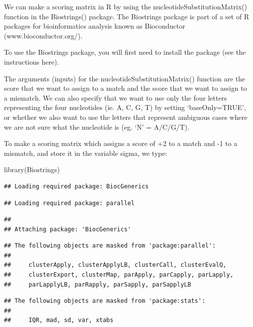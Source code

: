 \documentclass[
]{book}
\newenvironment{Shaded}{\begin{snugshade}}{\end{snugshade}}
\newcommand{\FunctionTok}[1]{\textcolor[rgb]{0.00,0.00,0.00}{#1}}
\newcommand{\NormalTok}[1]{#1}
\begin{document}
We can make a scoring matrix in R by using the nucleotideSubstitutionMatrix() function in the Biostrings() package. The Biostrings package is part of a set of R packages for bioinformatics analysis known as Bioconductor (www.bioconductor.org/).

To use the Biostrings package, you will first need to install the package (see the instructions here).

The arguments (inputs) for the nucleotideSubstitutionMatrix() function are the score that we want to assign to a match and the score that we want to assign to a mismatch. We can also specify that we want to use only the four letters representing the four nucleotides (ie. A, C, G, T) by setting `baseOnly=TRUE', or whether we also want to use the letters that represent ambiguous cases where we are not sure what the nucleotide is (eg. `N' = A/C/G/T).

To make a scoring matrix which assigns a score of +2 to a match and -1 to a mismatch, and store it in the variable sigma, we type:

\begin{Shaded}
\begin{Highlighting}[]
\FunctionTok{library}\NormalTok{(Biostrings)}
\end{Highlighting}
\end{Shaded}

\begin{verbatim}
## Loading required package: BiocGenerics
\end{verbatim}

\begin{verbatim}
## Loading required package: parallel
\end{verbatim}

\begin{verbatim}
## 
## Attaching package: 'BiocGenerics'
\end{verbatim}

\begin{verbatim}
## The following objects are masked from 'package:parallel':
## 
##     clusterApply, clusterApplyLB, clusterCall, clusterEvalQ,
##     clusterExport, clusterMap, parApply, parCapply, parLapply,
##     parLapplyLB, parRapply, parSapply, parSapplyLB
\end{verbatim}

\begin{verbatim}
## The following objects are masked from 'package:stats':
## 
##     IQR, mad, sd, var, xtabs
\end{verbatim}
\end{document}
